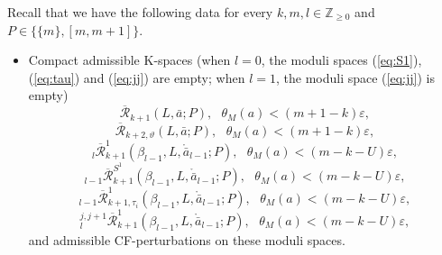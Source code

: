 \documentclass[a4paper]{article}
\numberwithin{equation}{section}
\begin{document}
Recall that we have the following data for every $k,m,l\in\mathbb{Z}_{\geq0}$ and $P\in\{\{m\},[m,m+1]\}$.
\begin{itemize}
	\item[(i)] Compact admissible K-spaces (when $l=0$, the moduli spaces (\ref{eq:S1}), (\ref{eq:tau}) and (\ref{eq:jj}) are empty; when $l=1$, the moduli space (\ref{eq:jj}) is empty)
	\begin{equation}\label{eq:d}
	\overline{\mathcal{R}}_{k+1}(L,\bar{a};P),\textrm{ }\theta_M(a)<(m+1-k)\varepsilon,
	\end{equation}
	\begin{equation}\label{eq:theta}
    \overline{\mathcal{R}}_{k+2,\vartheta}(L,\bar{a};P),\textrm{ }\theta_M(a)<(m+1-k)\varepsilon,
	\end{equation}
    \begin{equation}\label{eq:CG}
    {}_l\overline{\mathcal{R}}_{k+1}^1(\beta_{l-1},L,\ring{\bar{a}}_{l-1};P),\textrm{ }\theta_M(a)<(m-k-U)\varepsilon,
    \end{equation}
    \begin{equation}\label{eq:S1}
    {}_{l-1}\overline{\mathcal{R}}^{S^1}_{k+1}(\beta_{l-1},L,\ring{\bar{a}}_{l-1};P),\textrm{ }\theta_M(a)<(m-k-U)\varepsilon,
    \end{equation}
    \begin{equation}\label{eq:tau}
    {}_{l-1}\overline{\mathcal{R}}_{k+1,\tau_i}^1(\beta_{l-1},L,\ring{\bar{a}}_{l-1};P),\textrm{ }\theta_M(a)<(m-k-U)\varepsilon,
    \end{equation}
    \begin{equation}\label{eq:jj}
    {}_l^{j,j+1}\overline{\mathcal{R}}_{k+1}^1(\beta_{l-1},L,\ring{\bar{a}}_{l-1};P),\textrm{ }\theta_M(a)<(m-k-U)\varepsilon,
    \end{equation}
    and admissible CF-perturbations on these moduli spaces.
    

\end{itemize}
\end{document}
